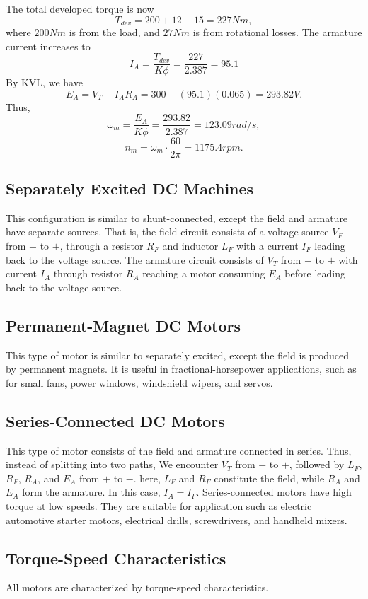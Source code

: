 \documentclass[11pt]{article}
\theoremstyle{plain} %
\theoremstyle{definition}
\theoremstyle{example}
\theoremstyle{remark}
\begin{document}
The total developed torque is now 
$$T_{dev} = 200+12+15=227Nm,$$
where $200Nm$ is from the load, and $27Nm$ is from rotational losses. The armature current increases to $$I_A = \frac{T_{dev}}{K\phi} = \frac{227}{2.387} = 95.1$$By KVL, we have 
$$E_A = V_T-I_AR_A = 300-(95.1)(0.065) = 293.82V.$$
Thus, 
$$\omega_m = \frac{E_A}{K\phi} = \frac{293.82}{2.387} = 123.09rad/s,$$
$$n_m = \omega_m\cdot\frac{60}{2\pi} = 1175.4rpm.$$

\subsection{Separately Excited DC Machines}
This configuration is similar to shunt-connected, except the field and armature have separate sources. That is, the field circuit consists of a voltage source $V_F$ from $-$ to $+$, through a resistor $R_F$ and inductor $L_F$ with a current $I_F$ leading back to the voltage source. The armature circuit consists of $V_T$ from $-$ to $+$ with current $I_A$ through resistor $R_A$ reaching a motor consuming $E_A$ before leading back to the voltage source. 

\subsection{Permanent-Magnet DC Motors}
This type of motor is similar to separately excited, except the field is produced by permanent magnets. It is useful in fractional-horsepower applications, such as for small fans, power windows, windshield wipers, and servos. 
\subsection{Series-Connected DC Motors}
This type of motor consists of the field and armature connected in series. Thus, instead of splitting into two paths, We encounter $V_T$ from $-$ to $+$, followed by $L_F$, $R_F$, $R_A$, and $E_A$ from $+$ to $-$. here, $L_F$ and $R_F$ constitute the field, while $R_A$ and $E_A$ form the armature. In this case, $I_A = I_F$. Series-connected motors  have high torque at low speeds. They are suitable for application such as electric automotive starter motors, electrical drills, screwdrivers, and handheld mixers. 

\subsection{Torque-Speed Characteristics}
All motors are characterized by torque-speed characteristics. 
\end{document}
